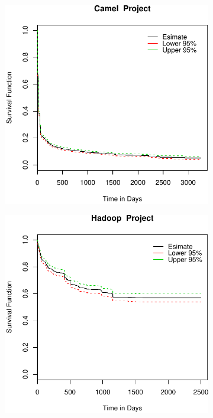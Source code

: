 \begin{figure}[t]
	\centering
	
	\begin{subfigure}[b]{0.195\textwidth}
		\includegraphics[width=\textwidth]{figures/Survival/camel.pdf}
		\label{fig:removal_comparison_camel_survival}
	\end{subfigure}
	\begin{subfigure}[b]{0.195\textwidth}
		\includegraphics[width=\textwidth]{figures/Survival/hadoop.pdf}

\end{subfigure}
\end{figure}
